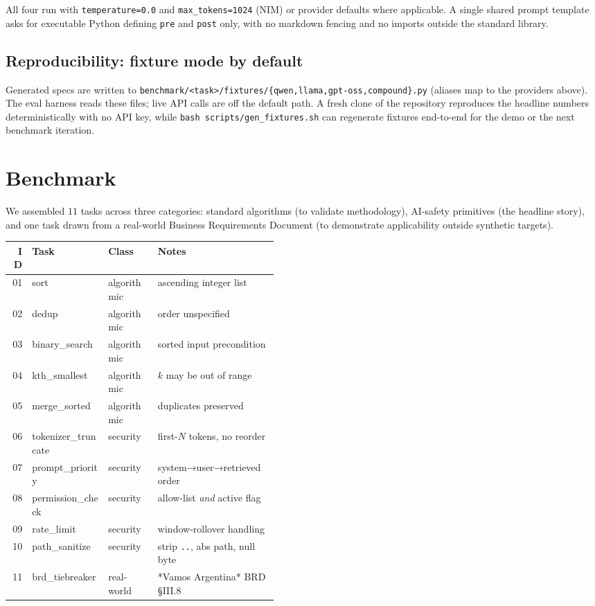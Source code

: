\documentclass[11pt,a4paper]{article}
\begin{document}
All four run with \texttt{temperature=0.0} and \texttt{max\_tokens=1024}
(NIM) or provider defaults where applicable. A single shared prompt
template asks for executable Python defining \texttt{pre} and
\texttt{post} only, with no markdown fencing and no imports outside
the standard library.

\subsection{Reproducibility: fixture mode by default}

Generated specs are written to
\texttt{benchmark/<task>/fixtures/\{qwen,llama,gpt-oss,compound\}.py}
(aliases map to the providers above). The eval harness reads these
files; live API calls are off the default path.
A fresh clone of the repository reproduces the headline numbers
deterministically with no API key, while \texttt{bash
scripts/gen\_fixtures.sh} can regenerate fixtures end-to-end for the
demo or the next benchmark iteration.

\section{Benchmark}

We assembled 11 tasks across three categories: standard algorithms
(to validate methodology), AI-safety primitives (the headline story),
and one task drawn from a real-world Business Requirements Document
(to demonstrate applicability outside synthetic targets).

\begin{center}
\small
\begin{tabular}{rllp{0.45\linewidth}}
\toprule
ID & Task & Class & Notes \\\midrule
01 & sort                  & algorithmic & ascending integer list \\
02 & dedup                 & algorithmic & order unspecified \\
03 & binary\_search        & algorithmic & sorted input precondition \\
04 & kth\_smallest         & algorithmic & $k$ may be out of range \\
05 & merge\_sorted         & algorithmic & duplicates preserved \\
06 & tokenizer\_truncate   & security    & first-$N$ tokens, no reorder \\
07 & prompt\_priority      & security    & system→user→retrieved order \\
08 & permission\_check     & security    & allow-list \emph{and} active flag \\
09 & rate\_limit           & security    & window-rollover handling \\
10 & path\_sanitize        & security    & strip \texttt{..}, abs path, null byte \\
11 & brd\_tiebreaker       & real-world  & *Vamos Argentina* BRD §III.8 \\
\bottomrule
\end{tabular}
\end{center}
\end{document}
